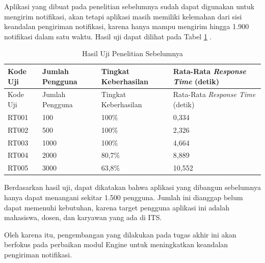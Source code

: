 \par Aplikasi yang dibuat pada penelitian sebelumnya sudah dapat digunakan untuk mengirim notifikasi, akan tetapi aplikasi masih memiliki kelemahan dari sisi keandalan pengiriman notifikasi, karena hanya mampu mengirim hingga 1.900 notifikasi dalam satu waktu. Hasil uji dapat dilihat pada Tabel \ref{t:hasil_uji_sebelum} \cite{application-thesis}.
\begin{longtable}{|p{1.5cm}|p{2cm}|p{2cm}|p{2.5cm}|}
	\caption{Hasil Uji Penelitian Sebelumnya} \label{t:hasil_uji_sebelum} \\ \hline
	\rowcolor{lightgray} Kode Uji & Jumlah Pengguna & Tingkat Keberhasilan & Rata-Rata \textit{Response Time} (detik) \\ \hline
	\endfirsthead
	\hline
	\rowcolor{lightgray} Kode Uji & Jumlah Pengguna & Tingkat Keberhasilan & Rata-Rata \textit{Response Time} (detik) \\ \hline
	\endhead
	RT001 & 100 & 100\% & 0,334 \\ \hline
	RT002 & 500 & 100\% & 2,326 \\ \hline
	RT003 & 1000 & 100\% & 4,664 \\ \hline
	RT004 & 2000 & 80,7\% & 8,889 \\ \hline
	RT005 & 3000 & 63,8\% & 10,552 \\ \hline
\end{longtable}
\par Berdasarkan hasil uji, dapat dikatakan bahwa aplikasi yang dibangun sebelumnya hanya dapat menangani sekitar 1.500 pengguna. Jumlah ini dianggap belum dapat memenuhi kebutuhan, karena target pengguna aplikasi ini adalah mahasiswa, dosen, dan karyawan yang ada di ITS.
\par Oleh karena itu, pengembangan yang dilakukan pada tugas akhir ini akan berfokus pada perbaikan modul Engine untuk meningkatkan keandalan pengiriman notifikasi.

